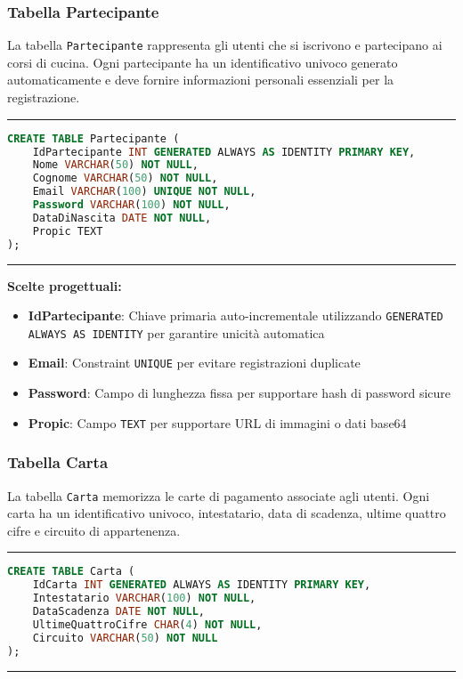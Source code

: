 \subsubsection{Tabella Partecipante}

La tabella \texttt{Partecipante} rappresenta gli utenti che si iscrivono e partecipano ai corsi di cucina. Ogni partecipante ha un identificativo univoco generato automaticamente e deve fornire informazioni personali essenziali per la registrazione.

\noindent\rule{\textwidth}{0.4pt}
\begin{lstlisting}[language=SQL, style=sqlstyle]
CREATE TABLE Partecipante (
    IdPartecipante INT GENERATED ALWAYS AS IDENTITY PRIMARY KEY,
    Nome VARCHAR(50) NOT NULL,
    Cognome VARCHAR(50) NOT NULL,
    Email VARCHAR(100) UNIQUE NOT NULL,
    Password VARCHAR(100) NOT NULL,
    DataDiNascita DATE NOT NULL,
    Propic TEXT
);
\end{lstlisting}
\noindent\rule{\textwidth}{0.4pt}

\textbf{Scelte progettuali:}
\begin{itemize}
    \item \textbf{IdPartecipante}: Chiave primaria auto-incrementale utilizzando \texttt{GENERATED ALWAYS AS IDENTITY} per garantire unicità automatica
    \item \textbf{Email}: Constraint \texttt{UNIQUE} per evitare registrazioni duplicate
    \item \textbf{Password}: Campo di lunghezza fissa per supportare hash di password sicure
    \item \textbf{Propic}: Campo \texttt{TEXT} per supportare URL di immagini o dati base64
\end{itemize}

\subsubsection{Tabella Carta}

La tabella \texttt{Carta} memorizza le carte di pagamento associate agli utenti. Ogni carta ha un identificativo univoco, intestatario, data di scadenza, ultime quattro cifre e circuito di appartenenza.

\noindent\rule{\textwidth}{0.4pt}
\begin{lstlisting}[language=SQL, style=sqlstyle]
CREATE TABLE Carta (
    IdCarta INT GENERATED ALWAYS AS IDENTITY PRIMARY KEY,
    Intestatario VARCHAR(100) NOT NULL,
    DataScadenza DATE NOT NULL,
    UltimeQuattroCifre CHAR(4) NOT NULL,
    Circuito VARCHAR(50) NOT NULL
);
\end{lstlisting}
\noindent\rule{\textwidth}{0.4pt}

